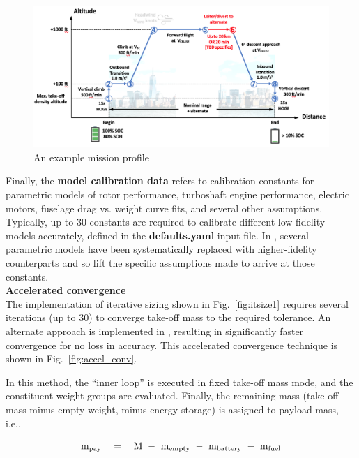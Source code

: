 \begin{figure}
\begin{center}
\includegraphics[width=\textwidth]{images/profile.png}
\caption{An example mission profile}
\label{fig:mission}
\end{center}
\end{figure}

Finally, the \textbf{model calibration data} refers to calibration constants for parametric models of rotor performance, turboshaft engine performance, electric motors, fuselage drag vs. weight curve fits, and several other assumptions. Typically, up to 30 constants are required to calibrate different low-fidelity models accurately, defined in the \textbf{defaults.yaml} input file. In \hydra, several parametric models have been systematically replaced with higher-fidelity counterparts and so lift the specific assumptions made to arrive at those constants. \\
\textbf{Accelerated convergence} \\
The implementation of iterative sizing shown in Fig.~\ref{fig:itsize1} requires several iterations (up to 30) to converge take-off mass to the required tolerance. An alternate approach is implemented in \hydra, resulting in significantly faster convergence for no loss in accuracy. This accelerated convergence technique is shown in Fig.~\ref{fig:accel_conv}. 

In this method, the ``inner loop'' is executed in fixed take-off mass mode, and the constituent weight groups are evaluated. Finally, the remaining mass (take-off mass minus empty weight, minus energy storage) is assigned to payload mass, i.e., 

\begin{equation}
\textrm{m}_{\rm pay} \quad = \quad \textrm{M} \textrm{ } - \textrm{ } \textrm{m}_{\rm empty} \textrm{ } - \textrm{ } \textrm{m}_{\rm battery} \textrm{ } - \textrm{ } \textrm{m}_{\rm fuel}
\end{equation}

